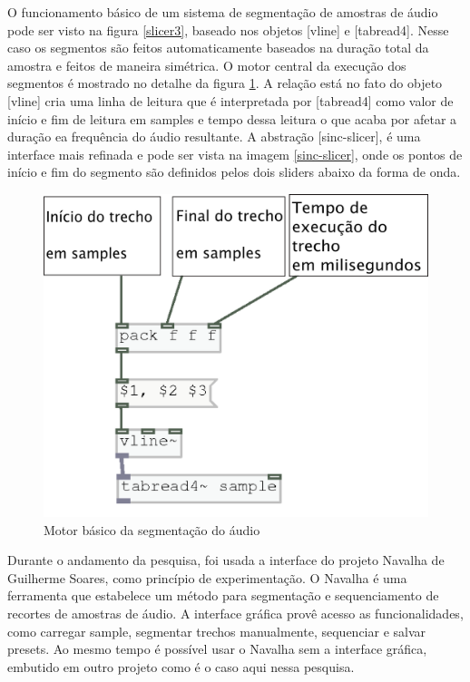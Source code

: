 \documentclass[draft]{ppgmus}
\begin{document}
O funcionamento básico de um sistema de segmentação de amostras de áudio pode ser visto na figura \ref{slicer3},
baseado nos objetos [vline\texttildelow] e [tabread4\texttildelow]. Nesse caso os segmentos são feitos
automaticamente baseados na duração total da amostra e feitos de maneira simétrica.
O motor central da execução dos segmentos é mostrado no detalhe da figura \ref{slice-motor}.
A relação está no fato do objeto [vline\texttildelow] cria uma linha de leitura que é interpretada
por [tabread4\texttildelow] como valor de início e fim de leitura em samples e tempo dessa
leitura o que acaba por afetar a duração ea frequência do áudio resultante. 
A abstração [sinc-slicer], é uma interface mais refinada e pode ser vista na imagem \ref{sinc-slicer}, 
onde os pontos de início e fim do segmento são definidos pelos dois sliders abaixo da forma de onda.

\begin{figure}
\includegraphics[scale=.6]{slice-motor}
\caption{Motor básico da segmentação do áudio}
\label{slice-motor}
\end{figure}

Durante o andamento da pesquisa, foi usada a interface do projeto Navalha de Guilherme Soares,
como princípio de experimentação.
O Navalha é uma ferramenta que estabelece
um método para segmentação e sequenciamento de recortes de amostras de áudio. A interface gráfica
provê acesso as funcionalidades, como carregar sample, segmentar trechos manualmente, sequenciar e 
salvar presets. Ao mesmo tempo é possível usar o Navalha sem a interface gráfica, embutido em outro
projeto como é o caso aqui nessa pesquisa.
\end{document}
